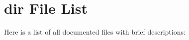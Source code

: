 \section{dir File List}
Here is a list of all documented files with brief descriptions:\begin{CompactList}
\item{}
\item{}
\end{CompactList}
